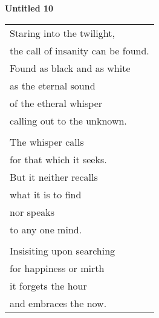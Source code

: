\documentclass{article}
\begin{document}
\begin{center}
\textbf{Untitled 10} \\
\vspace*{2ex}
\begin{tabular}{l}
Staring into the twilight, \\
the call of insanity can be found. \\
Found as black and as white \\
as the eternal sound \\
of the etheral whisper \\
calling out to the unknown. \\
\\
The whisper calls \\
for that which it seeks. \\
But it neither recalls \\
what it is to find \\
nor speaks \\
to any one mind. \\
\\
Insisiting upon searching \\
for happiness or mirth \\
it forgets the hour \\
and embraces the now. \\
\end{tabular}
\end{center}
\end{document}
